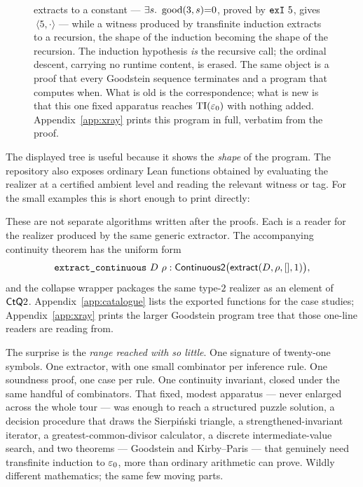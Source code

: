 \documentclass[11pt]{article}
\begin{document}
\begin{figure}[h]
{extracts to a constant --- $\exists s.\ \good(3,s){=}0$, proved by $\texttt{exI}\
5$, gives $\ \langle 5,\cdot\rangle$ --- while a witness produced by
transfinite induction extracts to a recursion, the shape of the induction
becoming the shape of the recursion. The induction hypothesis \emph{is} the
recursive call; the ordinal descent, carrying no runtime content, is erased. The
same object is a proof that every Goodstein sequence terminates and a program
that computes when. What is old is the correspondence; what is new is that this
one fixed apparatus reaches $\mathrm{TI}(\varepsilon_0)$ with nothing added.
Appendix~\ref{app:xray} prints this program in full, verbatim from the proof.}
\label{fig:curry-howard}
\end{figure}

The displayed tree is useful because it shows the \emph{shape} of the program.
The repository also exposes ordinary Lean functions obtained by evaluating the
realizer at a certified ambient level and reading the relevant witness or tag.
For the small examples this is short enough to print directly:

\begin{center}
\end{center}

\noindent
These are not separate algorithms written after the proofs. Each is a reader
for the realizer produced by the same generic extractor. The accompanying
continuity theorem has the uniform form
\[
  \texttt{extract\_continuous}\ D\ \rho :
  \mathsf{Continuous2}\bigl(\mathsf{extract}(D,\rho,[],1)\bigr),
\]
and the collapse wrapper packages the same type-$2$ realizer as an element of
$\mathsf{CtQ} 2$. Appendix~\ref{app:catalogue} lists the exported functions for the
case studies; Appendix~\ref{app:xray} prints the larger Goodstein program tree
that those one-line readers are reading from.

The surprise is the \emph{range reached with so little}. One signature of
twenty-one symbols. One extractor, with one small combinator per inference rule.
One soundness proof, one case per rule. One continuity invariant, closed under
the same handful of combinators. That fixed, modest apparatus --- never enlarged
across the whole tour --- was enough to reach a structured puzzle solution, a
decision procedure that draws the Sierpi\'nski triangle, a strengthened-invariant
iterator, a greatest-common-divisor calculator, a discrete intermediate-value
search, and two theorems --- Goodstein and Kirby--Paris --- that genuinely need
transfinite induction to $\varepsilon_0$, more than ordinary arithmetic can prove. Wildly
different mathematics; the same few moving parts.
\end{document}

